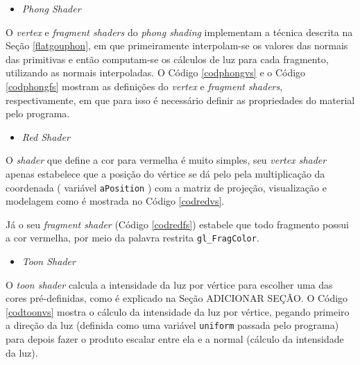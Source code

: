 	\begin{itemize}
  	\item \textit{Phong Shader}
	\end{itemize}

	O \textit{vertex} e \textit{fragment shaders} do \textit{phong shading} implementam a técnica descrita na Seção \ref{flatgouphon}, em que primeiramente interpolam-se os valores das normais das primitivas e então computam-se os cálculos de luz para cada fragmento, utilizando as normais interpoladas. O Código \ref{codphongvs} e o Código \ref{codphongfs} mostram as definições do \textit{vertex} e \textit{fragment shaders}, respectivamente, em que para isso é necessário definir as propriedades do material pelo programa.  

	

	
	

	\begin{itemize}
  	\item \textit{Red Shader}
	\end{itemize}

	
	O \textit{shader} que define a cor para vermelha é muito simples,  seu \textit{vertex shader} apenas estabelece que a posição do vértice  se dá pelo pela multiplicação da coordenada ( variável \texttt{aPosition} ) com a matriz de projeção, visualização e modelagem como é mostrada no Código \ref{codredvs}. 
	
	

	Já o seu \textit{fragment shader} (Código \ref{codredfs}) estabele que todo fragmento possui a cor vermelha, por meio da palavra restrita \texttt{gl\_FragColor}.
	
	

	\begin{itemize}
  	\item \textit{Toon Shader}
	\end{itemize}

	O  \textit{toon shader} calcula a intensidade da luz por vértice para escolher uma das cores pré-definidas, como é explicado na Seção ADICIONAR SEÇÃO. O Código  \ref{codtoonvs} mostra o cálculo da intensidade da luz por vértice, pegando primeiro a direção da luz (definida como uma variável \texttt{uniform} passada pelo programa) para depois fazer o produto escalar entre ela e a normal (cálculo da intensidade da luz).  


